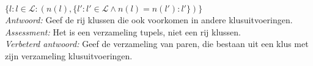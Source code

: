 
\item $\{l : l \in \mathcal{L} : (n(l), \{l' : l' \in \mathcal{L} \wedge n(l) = n(l') : l'\} ) \}$ \\


\emph{Antwoord:} Geef de rij klussen die ook voorkomen in andere klusuitvoeringen. \\
\emph{Assessment:} Het is een verzameling tupels, niet een rij klussen. \\

\emph{Verbeterd antwoord:} Geef de verzameling van paren, die bestaan uit een klus met zijn verzameling klusuitvoeringen. \\
